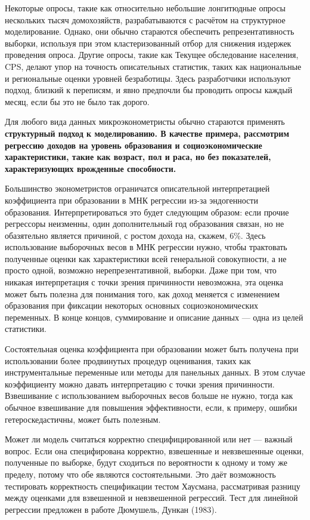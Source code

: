 Некоторые опросы, такие как относительно небольшие лонгитюдные опросы нескольких тысяч домохозяйств, разрабатываются с расчётом на структурное моделирование. Однако, они обычно стараются обеспечить репрезентативность выборки, используя при этом кластеризованный отбор для снижения издержек проведения опроса. Другие опросы, такие как Текущее обследование населения, CPS, делают упор на точность описательных статистик, таких как национальные и региональные оценки уровней безработицы. Здесь разработчики используют подход, близкий к переписям, и явно предпочли бы проводить опросы каждый месяц, если бы это не было так дорого. 

Для любого вида данных микроэконометристы обычно стараются применять \bfseries структурный подход к моделированию. \mdseries В качестве примера, рассмотрим регрессию доходов на уровень образования и социоэкономические характеристики, такие как возраст, пол и раса, но без показателей, характеризующих врожденные способности. 

Большинство эконометристов ограничатся описательной интерпретацией коэффициента при образовании в МНК регрессии из-за эндогенности образования. Интерпретироваться это будет следующим образом: если прочие регрессоры неизменны, один дополнительный год образования связан, но не обазятельно является причиной, с ростом дохода на, скажем, 6\%. Здесь использование выборочных весов в МНК регрессии нужно, чтобы трактовать полученные оценки как характеристики всей генеральной совокупности, а не просто одной, возможно нерепрезентативной, выборки. Даже при том, что никакая интерпретация с точки зрения причинности невозможна, эта оценка может быть полезна для понимания того, как доход меняется с изменением образования при фиксации некоторых основных социоэкономических переменных. В конце концов, суммирование и описание данных --- одна из целей статистики. 

Состоятельная оценка коэффициента при образовании может быть получена при использовании более продвинутых процедур оценивания, таких как инструментальные переменные или методы для панельных данных. В этом случае коэффициенту можно давать интерпретацию с точки зрения причинности. Взвешивание с использованием выборочных весов больше не нужно, тогда как обычное взвешивание для повышения эффективности, если, к примеру, ошибки гетероскедастичны, может быть полезным. 

Может ли модель считаться корректно специфицированной или нет --- важный вопрос. Если она специфирована корректно, взвешенные и невзвешенные оценки, полученные по выборке, будут сходиться по вероятности к одному и тому же пределу, потому что обе являются состоятельными. Это даёт возможность тестировать корректность спецификации тестом Хаусмана, рассматривая разницу между оценками для взвешенной и невзвешенной регрессий. Тест для линейной регрессии предложен в работе Дюмушель, Дункан (1983). 

